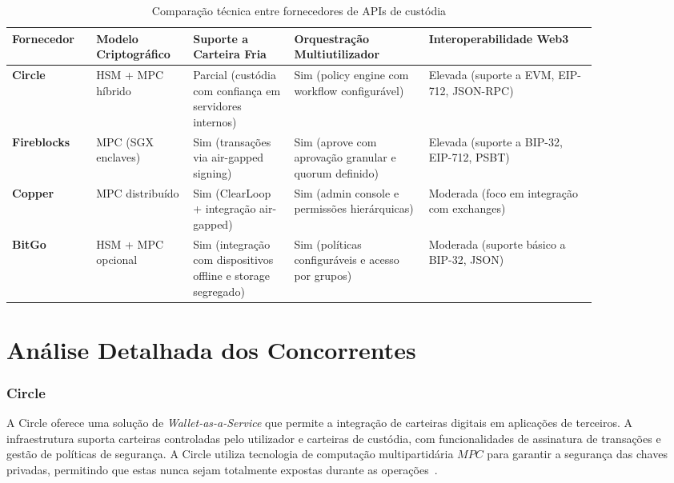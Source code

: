 \begin{table}[h]
    \centering
    \caption{Comparação técnica entre fornecedores de APIs de custódia}
    \label{tab:concorrentes}
    \small
    \begin{tabular}{| >{\centering\arraybackslash}p{0.12\linewidth} | >{\centering\arraybackslash}p{0.13\linewidth} | >{\centering\arraybackslash}p{0.15\linewidth} | >{\centering\arraybackslash}p{0.2\linewidth} | >{\centering\arraybackslash}p{0.25\linewidth} |}
        \hline
        \textbf{Fornecedor} & \textbf{Modelo Criptográfico} & \textbf{Suporte a Carteira Fria} & \textbf{Orquestração Multiutilizador} & \textbf{Interoperabilidade Web3} \\ \hline
        \textbf{Circle} & HSM + MPC híbrido & Parcial (custódia com confiança em servidores internos) & Sim (policy engine com workflow configurável) & Elevada (suporte a EVM, EIP-712, JSON-RPC) \\ \hline
        \textbf{Fireblocks} & MPC (SGX enclaves) & Sim (transações via air-gapped signing) & Sim (aprove com aprovação granular e quorum definido) & Elevada (suporte a BIP-32, EIP-712, PSBT) \\ \hline
        \textbf{Copper} & MPC distribuído & Sim (ClearLoop + integração air-gapped) & Sim (admin console e permissões hierárquicas) & Moderada (foco em integração com exchanges) \\ \hline
        \textbf{BitGo} & HSM + MPC opcional & Sim (integração com dispositivos offline e storage segregado) & Sim (políticas configuráveis e acesso por grupos) & Moderada (suporte básico a BIP-32, JSON) \\ \hline
    \end{tabular}
\end{table}

\section{Análise Detalhada dos Concorrentes}
\subsubsection{Circle}
A Circle oferece uma solução de \textit{Wallet-as-a-Service} que permite a integração de carteiras digitais em aplicações de terceiros. A infraestrutura suporta carteiras controladas pelo utilizador e carteiras de custódia, com funcionalidades de assinatura de transações e gestão de políticas de segurança. A Circle utiliza tecnologia de computação multipartidária \(MPC\) para garantir a segurança das chaves privadas, permitindo que estas nunca sejam totalmente expostas durante as operações~\cite{circle2023, quicknode2023}.

